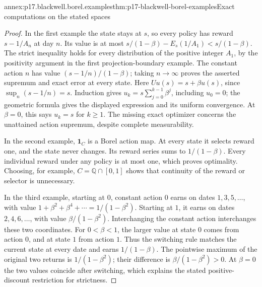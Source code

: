 \begin{annexitem}{annex:p17.blackwell.borel.examples}{thm:p17-blackwell-borel-examples}{Exact computations on the stated spaces}
\begin{proof}
In the first example the state stays at \(s\), so every
policy has reward \(s-1/A_n\) at day \(n\).
Its value is at most
\(s/(1-\beta)-E_s(1/A_1)<s/(1-\beta)\).
The strict inequality holds for every distribution of
the positive integer \(A_1\), by the positivity argument
in the first projection-boundary example.
The constant action \(n\) has value
\((s-1/n)/(1-\beta)\); taking \(n\to\infty\) proves
the asserted supremum and exact error at every state.
Here \(Uu(s)=s+\beta u(s)\), since
\(\sup_n(s-1/n)=s\).
Induction gives \(u_k=s\sum_{j=0}^{k-1}\beta^j\),
including \(u_0=0\); the geometric formula gives the
displayed expression and its uniform convergence.
At \(\beta=0\), this says \(u_k=s\) for \(k\geq1\).
The missing exact optimizer concerns the unattained
action supremum, despite complete measurability.

In the second example, \(\mathbf1_C\) is a Borel action
map. At every state it selects reward one, and the state
never changes. Its reward series sums to \(1/(1-\beta)\).
Every individual reward under any policy is at most one,
which proves optimality. Choosing, for example,
\(C=\mathbb Q\cap[0,1]\) shows that continuity of the
reward or selector is unnecessary.

In the third example, starting at \(0\), constant action
\(0\) earns on dates \(1,3,5,\ldots\), with value
\(1+\beta^2+\beta^4+\cdots=1/(1-\beta^2)\).
Starting at \(1\), it earns on dates \(2,4,6,\ldots\),
with value \(\beta/(1-\beta^2)\). Interchanging the
constant action interchanges these two coordinates.
For \(0<\beta<1\), the larger value at state \(0\)
comes from action \(0\), and at state \(1\) from action
\(1\). Thus the switching rule matches the current
state at every date and earns \(1/(1-\beta)\).
The pointwise maximum of the original two returns is
\(1/(1-\beta^2)\); their difference is
\(\beta/(1-\beta^2)>0\).
At \(\beta=0\) the two values coincide after switching,
which explains the stated positive-discount restriction
for strictness.
\end{proof}
\end{annexitem}
